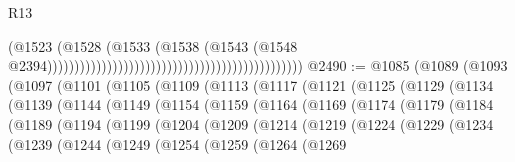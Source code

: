 \begin{lexlean}{R13}
\begin{coremodule}
                                                                                      (@1523
                                                                                        (@1528
                                                                                          (@1533
                                                                                            (@1538
                                                                                              (@1543
                                                                                                (@1548
                                                                                                  @2394)))))))))))))))))))))))))))))))))))))))))))))))
@2490 := @1085
    (@1089
      (@1093
        (@1097
          (@1101
            (@1105
              (@1109
                (@1113
                  (@1117
                    (@1121
                      (@1125
                        (@1129
                          (@1134
                            (@1139
                              (@1144
                                (@1149
                                  (@1154
                                    (@1159
                                      (@1164
                                        (@1169
                                          (@1174
                                            (@1179
                                              (@1184
                                                (@1189
                                                  (@1194
                                                    (@1199
                                                      (@1204
                                                        (@1209
                                                          (@1214
                                                            (@1219
                                                              (@1224
                                                                (@1229
                                                                  (@1234
                                                                    (@1239
                                                                      (@1244
                                                                        (@1249
                                                                          (@1254
                                                                            (@1259
                                                                              (@1264
                                                                                (@1269

\end{coremodule}
\end{lexlean}
